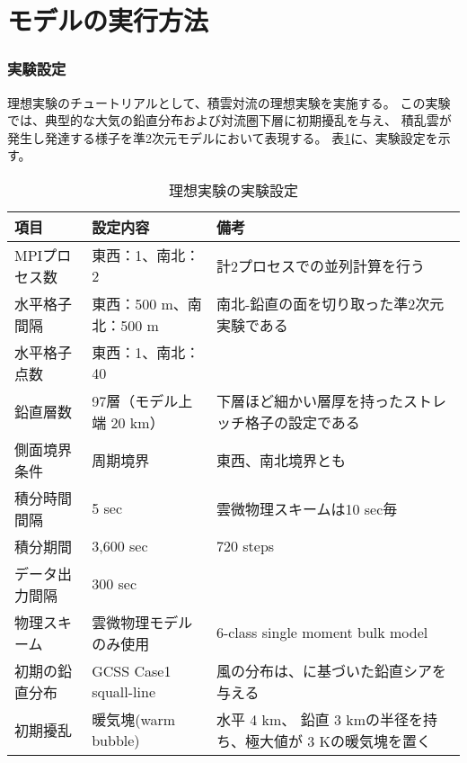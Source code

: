 \section{モデルの実行方法} \label{sec:ideal_exp_run}

\subsubsection{実験設定}

理想実験のチュートリアルとして、積雲対流の理想実験を実施する。
この実験では、典型的な大気の鉛直分布および対流圏下層に初期擾乱を与え、
積乱雲が発生し発達する様子を準2次元モデルにおいて表現する。
表\ref{tab:setting_ideal}に、実験設定を示す。

\begin{table}[htb]
\begin{minipage}{150mm}
\begin{center}
\caption{理想実験の実験設定}
\begin{tabularx}{150mm}{|l|X|X|} \hline
 \rowcolor[gray]{0.9} 項目 & 設定内容 & 備考 \\ \hline
 MPIプロセス数 & 東西：1、南北：2 & 計2プロセスでの並列計算を行う \\ \hline
 水平格子間隔 & 東西：500 m、南北：500 m & 南北-鉛直の面を切り取った準2次元実験である \\ \hline
 水平格子点数 & 東西：1、南北：40 &  \\ \hline
 鉛直層数     & 97層（モデル上端 20 km）& 下層ほど細かい層厚を持ったストレッチ格子の設定である \\ \hline
 側面境界条件 & 周期境界 & 東西、南北境界とも \\ \hline
 積分時間間隔 & 5 sec      & 雲微物理スキームは10 sec毎 \\ \hline
 積分期間     & 3,600 sec  & 720 steps \\ \hline
 データ出力間隔 & 300 sec  &  \\ \hline
 物理スキーム & 雲微物理モデルのみ使用 &
 6-class single moment bulk model \citep{tomita_2008} \\ \hline
 初期の鉛直分布 & GCSS Case1 squall-line \citep{Redelsperger2000}&
 風の分布は、\citet{Ooyama_2001}に基づいた鉛直シアを与える \\ \hline
 初期擾乱 & 暖気塊(warm bubble) & 水平 4 km、
 鉛直 3 kmの半径を持ち、極大値が 3 Kの暖気塊を置く\\ \hline
\end{tabularx}
\label{tab:setting_ideal}
\end{center}
\end{minipage}
\end{table}


